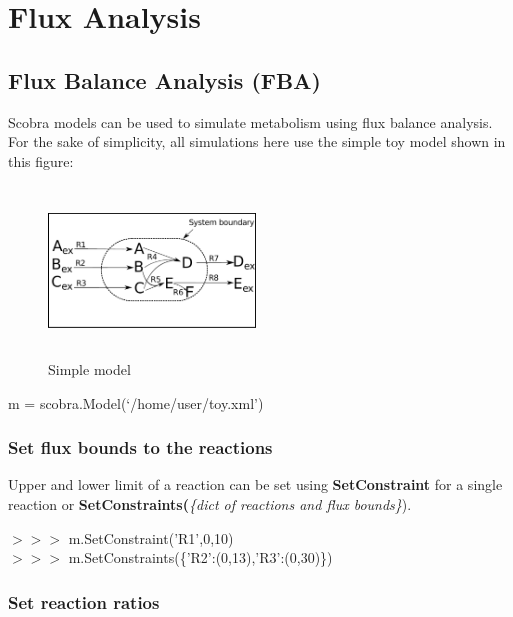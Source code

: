 \chapter{Flux Analysis}

\section{Flux Balance Analysis (FBA)}

Scobra models can be used to simulate metabolism using flux balance analysis. For the sake of simplicity, all simulations here use the simple toy model shown in this figure:

\begin{figure}[h]
\centering
\includegraphics[height=4.5cm, width=5.5cm]{./img/Flux_analysis/scr_res.pdf}
\caption{Simple model}
\end{figure}

\begin{framed}
m = scobra.Model(`/home/user/toy.xml')
\end{framed}


\subsection{Set flux bounds to the reactions}
Upper and lower limit of a reaction can be set using \textbf{SetConstraint} for a single reaction or \textbf{SetConstraints(}\textit{\{dict of reactions and flux bounds\}}).

\begin{framed}
$>>>$ m.SetConstraint('R1',0,10)\\
$>>>$ m.SetConstraints(\{'R2':(0,13),'R3':(0,30)\})
\end{framed}

 \subsection{Set reaction ratios}
 
